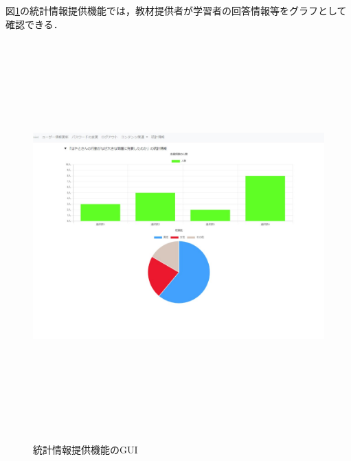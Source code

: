 \newpage
図\ref{toukei}の統計情報提供機能では，教材提供者が学習者の回答情報等をグラフとして確認できる．
\begin{figure}[htbp]
    \begin{center}
        \includegraphics[width=16cm,height=15cm,keepaspectratio]{toukei-crop.pdf}\\
    \end{center}
    \caption{統計情報提供機能のGUI}
    \label{toukei}
\end{figure}


